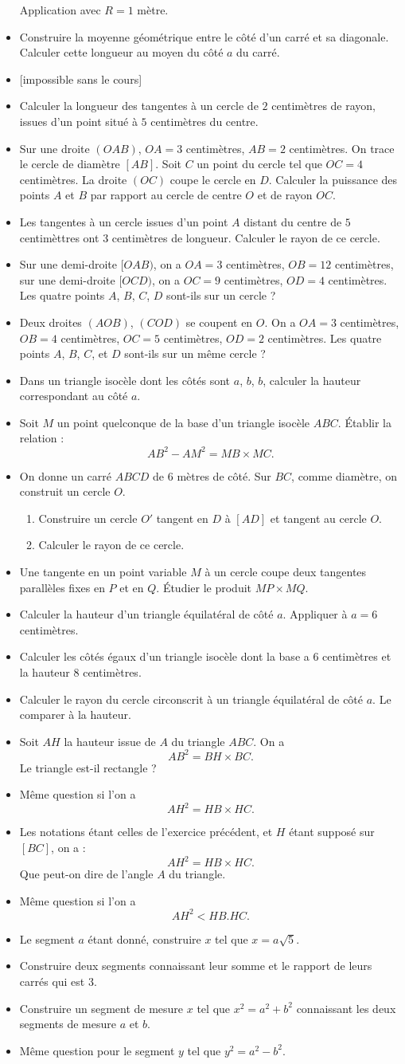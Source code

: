 \documentclass[12 pt]{report}
\theoremstyle{plain}
\newcounter{n}
\renewcommand{\it}{\item[$\mathbf{\then}.$]\stepcounter{n} }
\begin{document}
\begin{itemize}
 Application avec $R=1$ mètre. 
 \it Construire la moyenne géométrique entre le côté d'un carré et sa diagonale. Calculer cette longueur au moyen du côté $a$ du carré. 
 \it [impossible sans le cours]
 \it Calculer la longueur des tangentes à un cercle de $2$ centimètres de rayon, issues d'un point situé à $5$ centimètres du centre. 
 \it Sur une droite $(OAB)$, $OA= 3$ centimètres, $AB = 2$ centimètres. On trace le cercle de diamètre $[AB]$. Soit $C$ un point du cercle tel que $OC=4$ centimètres. La droite $(OC)$ coupe le cercle en $D$. Calculer la puissance des points $A$ et $B$ par rapport au cercle de centre $O$ et de rayon $OC$. 
 \it Les tangentes à un cercle issues d'un point $A$ distant du centre
 de $5$ centimèttres ont $3$ centimètres de longueur. Calculer le rayon
 de ce cercle. 
 \it Sur une demi-droite $[OAB)$, on a $OA= 3$ centimètres, $OB = 12$ centimètres, sur une demi-droite $[OCD)$, on a $OC = 9$ centimètres, $OD = 4 $ centimètres. Les quatre points $A$, $B$, $C$, $D$ sont-ils sur un cercle ? 
 \it Deux droites $(AOB)$, $(COD)$ se coupent en $O$. On a $OA=3$ centimètres, $OB = 4$ centimètres, $OC = 5$ centimètres, $OD = 2$ centimètres. Les quatre points $A$, $B$, $C$, et $D$ sont-ils sur un même cercle ? 
 \it Dans un triangle isocèle dont les côtés sont $a$, $b$, $b$, calculer la hauteur correspondant au côté $a$. 
 \it Soit $M$ un point quelconque de la base d'un triangle isocèle $ABC$. Établir la relation : \[ AB^2 - AM^2 = MB \times MC.\]
 \it On donne un carré $ABCD$ de $6$ mètres de côté. Sur $BC$, comme diamètre, on construit un cercle $O$. \begin{enumerate}
 \item Construire un cercle $O'$ tangent en $D$ à $[AD]$ et tangent au cercle $O$. 
 \item Calculer le rayon de ce cercle.
 \end{enumerate}
 \it Une tangente en un point variable $M$ à un cercle coupe deux tangentes parallèles fixes en $P$ et en $Q$. Étudier le produit $MP\times MQ$. 
 \it Calculer la hauteur d'un triangle équilatéral de côté $a$. Appliquer à $a=6$ centimètres. 
 \it Calculer les côtés égaux d'un triangle isocèle dont la base a $6$
 centimètres et la hauteur $8$ centimètres. 
 \it Calculer le rayon du cercle circonscrit à un triangle équilatéral de côté $a$. Le comparer à la hauteur. 
 \it Soit $AH$ la hauteur issue de $A$ du triangle $ABC$. On a \[
 AB^2 = BH \times BC.\] Le triangle est-il rectangle ? 
 \it Même question si l'on a \[AH^2 = HB\times HC.\]
 \it Les notations étant celles de l'exercice précédent, et $H$ étant supposé sur $[BC]$, on a : \[ AH^2 = HB\times HC.\] Que peut-on
 dire de l'angle $A$ du triangle. 
 \it Même question si l'on a \[ AH^2 < HB.HC.\]
 \it Le segment $a$ étant donné, construire $x$ tel que $x=a\sqrt5$. 
 \it Construire deux segments connaissant leur somme et le rapport de 
 leurs carrés qui est $3$. 
 \it Construire un segment de mesure $x$ tel que $x^2=a^2+b^2$ connaissant les deux segments de mesure $a$ et $b$. 
 \it Même question pour le segment $y$ tel que $y^2 = a^2-b^2$. 
 \end{itemize}
\end{document}
